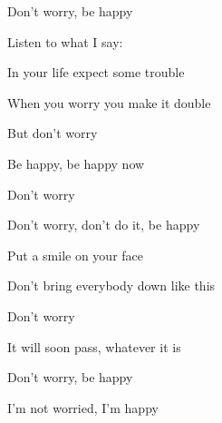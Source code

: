 Don't worry, be happy

Listen to what I say:

In your life expect some trouble

When you worry you make it double

But don't worry

Be happy, be happy now
\ks

\zr
\kr

\zs
Don't worry

Don't worry, don't do it, be happy

Put a smile on your face

Don't bring everybody down like this
\ks

\zr
Don't worry

It will soon pass, whatever it is

Don't worry, be happy

I'm not worried, I'm happy
\kr

\kp
